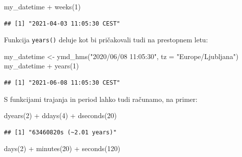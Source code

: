 \documentclass[
]{book}
\newenvironment{Shaded}{\begin{snugshade}}{\end{snugshade}}
\newcommand{\AttributeTok}[1]{\textcolor[rgb]{0.77,0.63,0.00}{#1}}
\newcommand{\DecValTok}[1]{\textcolor[rgb]{0.00,0.00,0.81}{#1}}
\newcommand{\FunctionTok}[1]{\textcolor[rgb]{0.00,0.00,0.00}{#1}}
\newcommand{\NormalTok}[1]{#1}
\newcommand{\OtherTok}[1]{\textcolor[rgb]{0.56,0.35,0.01}{#1}}
\newcommand{\SpecialCharTok}[1]{\textcolor[rgb]{0.00,0.00,0.00}{#1}}
\newcommand{\StringTok}[1]{\textcolor[rgb]{0.31,0.60,0.02}{#1}}
\begin{document}
\begin{Shaded}
\begin{Highlighting}[]
\NormalTok{my\_datetime }\SpecialCharTok{+} \FunctionTok{weeks}\NormalTok{(}\DecValTok{1}\NormalTok{)}
\end{Highlighting}
\end{Shaded}

\begin{verbatim}
## [1] "2021-04-03 11:05:30 CEST"
\end{verbatim}

Funkcija \texttt{years()} deluje kot bi pričakovali tudi na prestopnem letu:

\begin{Shaded}
\begin{Highlighting}[]
\NormalTok{my\_datetime }\OtherTok{\textless{}{-}} \FunctionTok{ymd\_hms}\NormalTok{(}\StringTok{"2020/06/08 11:05:30"}\NormalTok{, }\AttributeTok{tz =} \StringTok{"Europe/Ljubljana"}\NormalTok{)}
\NormalTok{my\_datetime }\SpecialCharTok{+} \FunctionTok{years}\NormalTok{(}\DecValTok{1}\NormalTok{)}
\end{Highlighting}
\end{Shaded}

\begin{verbatim}
## [1] "2021-06-08 11:05:30 CEST"
\end{verbatim}

S funkcijami trajanja in period lahko tudi računamo, na primer:

\begin{Shaded}
\begin{Highlighting}[]
\FunctionTok{dyears}\NormalTok{(}\DecValTok{2}\NormalTok{) }\SpecialCharTok{+} \FunctionTok{ddays}\NormalTok{(}\DecValTok{4}\NormalTok{) }\SpecialCharTok{+} \FunctionTok{dseconds}\NormalTok{(}\DecValTok{20}\NormalTok{)}
\end{Highlighting}
\end{Shaded}

\begin{verbatim}
## [1] "63460820s (~2.01 years)"
\end{verbatim}

\begin{Shaded}
\begin{Highlighting}[]
\FunctionTok{days}\NormalTok{(}\DecValTok{2}\NormalTok{) }\SpecialCharTok{+} \FunctionTok{minutes}\NormalTok{(}\DecValTok{20}\NormalTok{) }\SpecialCharTok{+} \FunctionTok{seconds}\NormalTok{(}\DecValTok{120}\NormalTok{)}
\end{Highlighting}
\end{Shaded}
\end{document}
